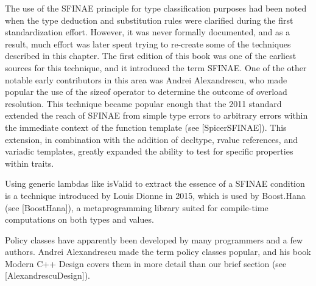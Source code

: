 The use of the SFINAE principle for type classification purposes had been noted when the type deduction and substitution rules were clarified during the first standardization effort. However, it was never formally documented, and as a result, much effort was later spent trying to re-create some of the techniques described in this chapter. The first edition of this book was one of the earliest sources for this technique, and it introduced the term SFINAE. One of the other notable early contributors in this area was Andrei Alexandrescu, who made popular the use of the sizeof operator to determine the outcome of overload resolution. This technique became popular enough that the 2011 standard extended the reach of SFINAE from simple type errors to arbitrary errors within the immediate context of the function template (see [SpicerSFINAE]). This extension, in combination with the addition of decltype, rvalue references, and variadic templates, greatly expanded the ability to test for specific properties within traits.

Using generic lambdas like isValid to extract the essence of a SFINAE condition is a technique introduced by Louis Dionne in 2015, which is used by Boost.Hana (see [BoostHana]), a metaprogramming library suited for compile-time computations on both types and values.

Policy classes have apparently been developed by many programmers and a few authors. Andrei Alexandrescu made the term policy classes popular, and his book Modern C++ Design covers them in more detail than our brief section (see [AlexandrescuDesign]).